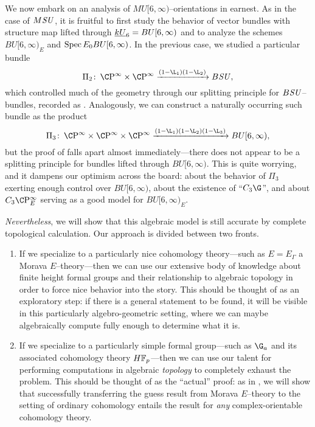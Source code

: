 We now embark on an analysis of \(MU[6, \infty)\)--orientations in earnest.  As in the case of \(M\mathit{SU}\), it is fruitful to first study the behavior of vector bundles with structure map lifted through \(\OS{kU}{6} = BU[6, \infty)\) and to analyze the schemes \(BU[6, \infty)_E\) and \(\operatorname{Spec} E_0 BU[6, \infty)\).  In the previous case, we studied a particular bundle \[\Pi_2\co \CP^\infty \times \CP^\infty \xrightarrow{(1 - \L_1)(1 - \L_2)} B\SU,\] which controlled much of the geometry through our splitting principle for \(B\mathit{SU}\)--bundles, recorded as .  Analogously, we can construct a naturally occurring such bundle as the product \[\Pi_3\co \CP^\infty \times \CP^\infty \times \CP^\infty \xrightarrow{(1 - \L_1)(1 - \L_2)(1 - \L_3)} BU[6, \infty),\] but the proof of  falls apart almost immediately---there does not appear to be a splitting principle for bundles lifted through \(BU[6, \infty)\).  This is quite worrying, and it dampens our optimism across the board: about the behavior of \(\Pi_3\) exerting enough control over \(BU[6, \infty)\), about the existence of ``\(C_3 \G\)'', and about \(C_3 \CP^\infty_E\) serving as a good model for \(BU[6, \infty)_E\).

\emph{Nevertheless}, we will show that this algebraic model is still accurate by complete topological calculation.  Our approach is divided between two fronts.
\begin{enumerate}
    \item If we specialize to a particularly nice cohomology theory---such as \(E = E_\Gamma\) a Morava \(E\)--theory---then we can use our extensive body of knowledge about finite height formal groups and their relationship to algebraic topology in order to force nice behavior into the story.  This should be thought of as an exploratory step: if there is a general statement to be found, it will be visible in this particularly algebro-geometric setting, where we can maybe algebraically compute fully enough to determine what it is.
    \item If we specialize to a particularly simple formal group---such as \(\G_a\) and its associated cohomology theory \(\HFp\)---then we can use our talent for performing computations in algebraic \emph{topology} to completely exhaust the problem.  This should be thought of as the ``actual'' proof: as in , we will show that successfully transferring the guess result from Morava \(E\)--theory to the setting of ordinary cohomology entails the result for \emph{any} complex-orientable cohomology theory.
\end{enumerate}

